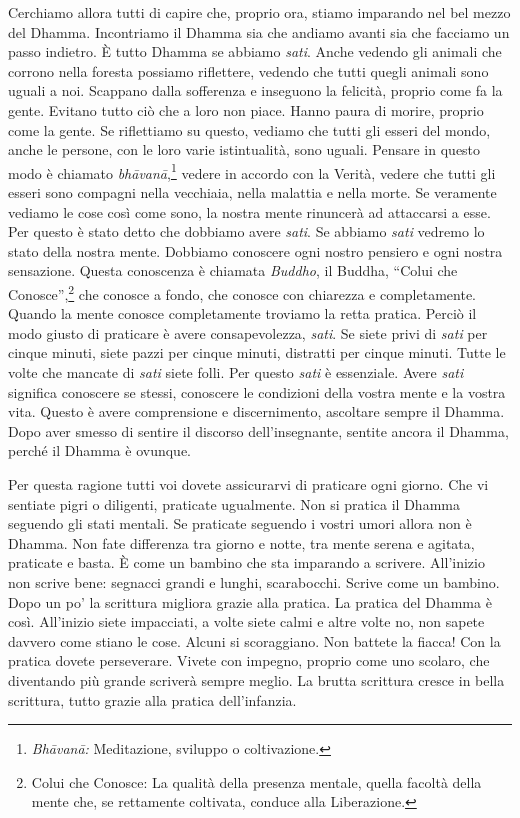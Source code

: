 Cerchiamo allora tutti di capire che, proprio ora, stiamo imparando nel
bel mezzo del Dhamma. Incontriamo il Dhamma sia che andiamo avanti sia
che facciamo un passo indietro. È tutto Dhamma se abbiamo \emph{sati}.
Anche vedendo gli animali che corrono nella foresta possiamo riflettere,
vedendo che tutti quegli animali sono uguali a noi. Scappano dalla
sofferenza e inseguono la felicità, proprio come fa la gente. Evitano
tutto ciò che a loro non piace. Hanno paura di morire, proprio come la
gente. Se riflettiamo su questo, vediamo che tutti gli esseri del mondo,
anche le persone, con le loro varie istintualità, sono uguali. Pensare
in questo modo è chiamato \emph{bhāvanā},\footnote{\emph{Bhāvanā:}
  Meditazione, sviluppo o coltivazione.} vedere in accordo con la
Verità, vedere che tutti gli esseri sono compagni nella vecchiaia, nella
malattia e nella morte. Se veramente vediamo le cose così come sono, la
nostra mente rinuncerà ad attaccarsi a esse. Per questo è stato detto
che dobbiamo avere \emph{sati}. Se abbiamo \emph{sati} vedremo lo stato
della nostra mente. Dobbiamo conoscere ogni nostro pensiero e ogni
nostra sensazione. Questa conoscenza è chiamata \emph{Buddho}, il
Buddha, ``Colui che Conosce'',\footnote{Colui che Conosce: La qualità
  della presenza mentale, quella facoltà della mente che, se rettamente
  coltivata, conduce alla Liberazione.} che conosce a fondo, che conosce
con chiarezza e completamente. Quando la mente conosce completamente
troviamo la retta pratica. Perciò il modo giusto di praticare è avere
consapevolezza, \emph{sati}. Se siete privi di \emph{sati} per cinque
minuti, siete pazzi per cinque minuti, distratti per cinque minuti.
Tutte le volte che mancate di \emph{sati} siete folli. Per questo
\emph{sati} è essenziale. Avere \emph{sati} significa conoscere se
stessi, conoscere le condizioni della vostra mente e la vostra vita.
Questo è avere comprensione e discernimento, ascoltare sempre il Dhamma.
Dopo aver smesso di sentire il discorso dell'insegnante, sentite ancora
il Dhamma, perché il Dhamma è ovunque.

Per questa ragione tutti voi dovete assicurarvi di praticare ogni
giorno. Che vi sentiate pigri o diligenti, praticate ugualmente. Non si
pratica il Dhamma seguendo gli stati mentali. Se praticate seguendo i
vostri umori allora non è Dhamma. Non fate differenza tra giorno e
notte, tra mente serena e agitata, praticate e basta. È come un bambino
che sta imparando a scrivere. All'inizio non scrive bene: segnacci
grandi e lunghi, scarabocchi. Scrive come un bambino. Dopo un po' la
scrittura migliora grazie alla pratica. La pratica del Dhamma è così.
All'inizio siete impacciati, a volte siete calmi e altre volte no, non
sapete davvero come stiano le cose. Alcuni si scoraggiano. Non battete
la fiacca! Con la pratica dovete perseverare. Vivete con impegno,
proprio come uno scolaro, che diventando più grande scriverà sempre
meglio. La brutta scrittura cresce in bella scrittura, tutto grazie alla
pratica dell'infanzia.

